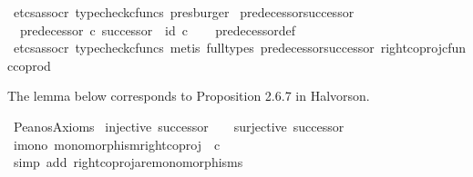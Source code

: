 \begin{isabellebody}
\ {\isacharparenleft}{\kern0pt}etcs{\isacharunderscore}{\kern0pt}assocr{\isacharcomma}{\kern0pt}\ typecheck{\isacharunderscore}{\kern0pt}cfuncs{\isacharcomma}{\kern0pt}\ presburger{\isacharparenright}{\kern0pt}%
\endisatagproof
{\isafoldproof}%
%
\isadelimproof
\isanewline
%
\endisadelimproof
\isanewline
{}\isamarkupfalse%
\ predecessor{\isacharunderscore}{\kern0pt}successor{\isacharcolon}{\kern0pt}\isanewline
\ \ {\isachardoublequoteopen}predecessor\ {\isasymcirc}\isactrlsub c\ successor\ {\isacharequal}{\kern0pt}\ id\ {\isasymnat}\isactrlsub c{\isachardoublequoteclose}\isanewline
%
\isadelimproof
\ \ %
\endisadelimproof
%
\isatagproof
{}\isamarkupfalse%
\ predecessor{\isacharunderscore}{\kern0pt}def\isanewline
\ \ \isamarkupfalse%
\ {\isacharparenleft}{\kern0pt}etcs{\isacharunderscore}{\kern0pt}assocr{\isacharcomma}{\kern0pt}\ typecheck{\isacharunderscore}{\kern0pt}cfuncs{\isacharcomma}{\kern0pt}\ metis\ {\isacharparenleft}{\kern0pt}full{\isacharunderscore}{\kern0pt}types{\isacharparenright}{\kern0pt}\ predecessor{\isacharprime}{\kern0pt}{\isacharunderscore}{\kern0pt}successor\ right{\isacharunderscore}{\kern0pt}coproj{\isacharunderscore}{\kern0pt}cfunc{\isacharunderscore}{\kern0pt}coprod{\isacharparenright}{\kern0pt}%
\endisatagproof
{\isafoldproof}%
%
\isadelimproof
%
\endisadelimproof
%
\isadelimdocument
%
\endisadelimdocument
%
\isatagdocument
%
\isamarkuptrue%
%
\endisatagdocument
{\isafolddocument}%
%
\isadelimdocument
%
\endisadelimdocument
%
\begin{isamarkuptext}%
The lemma below corresponds to Proposition 2.6.7 in Halvorson.%
\end{isamarkuptext}\isamarkuptrue%
\isamarkupfalse%
\ Peano{\isacharprime}{\kern0pt}s{\isacharunderscore}{\kern0pt}Axioms{\isacharcolon}{\kern0pt}\isanewline
\ {\isachardoublequoteopen}injective\ successor\ \ {\isasymand}\ {\isasymnot}\ surjective\ successor{\isachardoublequoteclose}\isanewline
%
\isadelimproof
%
\endisadelimproof
%
\isatagproof
{}\isamarkupfalse%
\ {\isacharminus}{\kern0pt}\ \isanewline
\ \ \isamarkupfalse%
\ i{}{\isacharunderscore}{\kern0pt}mono{\isacharcolon}{\kern0pt}\ {\isachardoublequoteopen}monomorphism{\isacharparenleft}{\kern0pt}right{\isacharunderscore}{\kern0pt}coproj\ {\isasymone}\ {\isasymnat}\isactrlsub c{\isacharparenright}{\kern0pt}{\isachardoublequoteclose}\isanewline
\ \ \ \ \isamarkupfalse%
\ {\isacharparenleft}{\kern0pt}simp\ add{\isacharcolon}{\kern0pt}\ right{\isacharunderscore}{\kern0pt}coproj{\isacharunderscore}{\kern0pt}are{\isacharunderscore}{\kern0pt}monomorphisms{\isacharparenright}{\kern0pt}\isanewline

\end{isabellebody}
